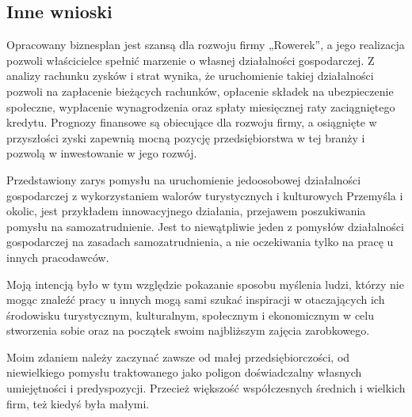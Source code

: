 \documentclass{sprawozdanie-agh}
\begin{document}
		\subsection{Inne wnioski}
		
		Opracowany biznesplan jest szansą dla rozwoju firmy „Rowerek”, a jego realizacja pozwoli właścicielce spełnić marzenie o własnej działalności gospodarczej. Z analizy rachunku zysków i strat wynika, że uruchomienie takiej działalności pozwoli na zapłacenie bieżących rachunków, opłacenie składek na ubezpieczenie społeczne, wypłacenie wynagrodzenia oraz spłaty miesięcznej raty zaciągniętego kredytu. Prognozy finansowe są obiecujące dla rozwoju firmy, a osiągnięte w przyszłości zyski zapewnią mocną pozycję przedsiębiorstwa w tej branży i pozwolą w inwestowanie w jego rozwój.
		
		Przedstawiony zarys pomysłu na uruchomienie jedoosobowej działalności gospodarczej z wykorzystaniem walorów turystycznych i kulturowych Przemyśla i okolic, jest przykładem innowacyjnego działania, przejawem poszukiwania pomysłu na samozatrudnienie. Jest to niewątpliwie jeden z pomysłów działalności gospodarczej na zasadach samozatrudnienia, a nie oczekiwania tylko na pracę u innych pracodawców.
		
		Moją intencją było w tym względzie pokazanie sposobu myślenia ludzi, którzy nie mogąc  znaleźć pracy u innych mogą sami szukać inspiracji w otaczających ich środowisku turystycznym, kulturalnym, społecznym i ekonomicznym w celu stworzenia sobie oraz na początek swoim najbliższym zajęcia zarobkowego.
		
		Moim zdaniem należy zaczynać zawsze od małej przedsiębiorczości, od niewielkiego pomysłu traktowanego jako poligon doświadczalny własnych umiejętności i predyspozycji. Przecież większość współczesnych średnich i wielkich firm, też kiedyś była małymi.
\end{document}
